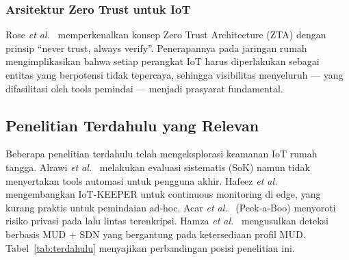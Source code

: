 \subsubsection{Arsitektur Zero Trust untuk IoT}
Rose \textit{et al.}~\cite{b19} memperkenalkan konsep Zero Trust Architecture
(ZTA) dengan prinsip ``never trust, always verify''. Penerapannya pada jaringan
rumah mengimplikasikan bahwa setiap perangkat IoT harus diperlakukan sebagai
entitas yang berpotensi tidak tepercaya, sehingga visibilitas menyeluruh ---
yang difasilitasi oleh tools pemindai --- menjadi prasyarat fundamental.

\subsection{Penelitian Terdahulu yang Relevan}
Beberapa penelitian terdahulu telah mengeksplorasi keamanan IoT rumah tangga.
Alrawi \textit{et al.}~\cite{b2} melakukan evaluasi sistematis (SoK) namun tidak
menyertakan tools automasi untuk pengguna akhir. Hafeez
\textit{et al.}~\cite{b4} mengembangkan IoT-KEEPER untuk continuous monitoring
di edge, yang kurang praktis untuk pemindaian ad-hoc. Acar
\textit{et al.}~\cite{b20} (Peek-a-Boo) menyoroti risiko privasi pada lalu
lintas terenkripsi. Hamza \textit{et al.}~\cite{b21} mengusulkan deteksi
berbasis MUD + SDN yang bergantung pada ketersediaan profil MUD. Tabel~\ref{tab:terdahulu}
menyajikan perbandingan posisi penelitian ini.

